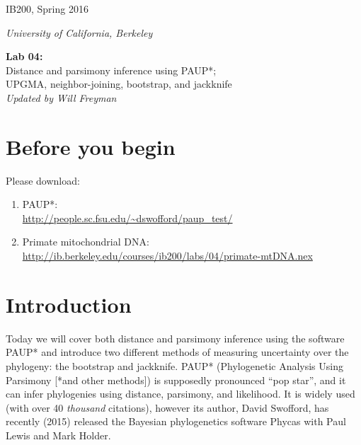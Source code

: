 \documentclass[11pt]{article}
\begin{document}
\noindent
\large
\begin{minipage}{0.5\textwidth}
\begin{flushleft} 
IB200, Spring 2016
\end{flushleft}
\end{minipage}
\begin{minipage}{0.5\textwidth}
\begin{flushright} 
\textit{University of California, Berkeley}
\end{flushright}
\end{minipage}

\vspace{0.5cm}


\begin{center}
\Large \textbf{Lab 04:} \\
Distance and parsimony inference using PAUP*; \\
UPGMA, neighbor-joining, bootstrap, and jackknife \\
\normalsize
\textit{Updated by Will Freyman}
\end{center}

\vspace{0.5cm}

\section{Before you begin}

Please download:

\begin{enumerate}
  \item PAUP*: \\ 
        \url{http://people.sc.fsu.edu/~dswofford/paup_test/}
  \item Primate mitochondrial DNA: \\
        \url{http://ib.berkeley.edu/courses/ib200/labs/04/primate-mtDNA.nex}
\end{enumerate}


\section{Introduction}

Today we will cover both distance and parsimony inference using the software PAUP*
and introduce two different methods of measuring uncertainty over
the phylogeny: the bootstrap and jackknife.
PAUP* (Phylogenetic Analysis Using Parsimony [*and other methods]) is 
supposedly pronounced “pop star”, and it 
can infer phylogenies using distance, parsimony, and likelihood. 
It is widely used (with over 40 \textit{thousand} citations),
however its author, David Swofford, has recently (2015) 
released the Bayesian phylogenetics software Phycas
with Paul Lewis and Mark Holder.
\end{document}
